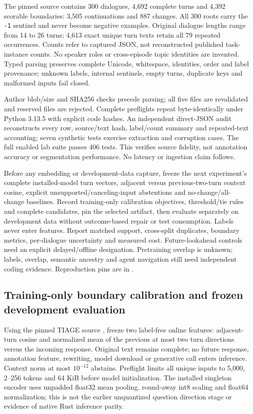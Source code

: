 \documentclass[11pt]{article}
\begin{document}
The pinned source contains 300 dialogues, 4,692 complete turns and 4,392 scorable
boundaries: 3,505 continuations and 887 changes. All 300 roots carry the
\texttt{-1} sentinel and never become negative examples. Original dialogue
lengths range from 14 to 26 turns; 4,613 exact unique turn texts retain all 79
repeated occurrences. Counts refer to captured JSON, not reconstructed published
task-instance counts. No speaker roles or cross-episode topic identities are
invented. Typed parsing preserves complete Unicode, whitespace, identities,
order and label provenance; unknown labels, internal sentinels, empty turns,
duplicate keys and malformed inputs fail closed.

Author blob/size and SHA256 checks precede parsing; all five files are
revalidated and reserved files are rejected. Complete preflights repeat
byte-identically under Python 3.13.5 with explicit code hashes. An independent direct-JSON audit reconstructs every row,
source/text hash, label/count summary and repeated-text accounting; seven
synthetic tests exercise extraction and corruption cases. The full enabled
lab suite passes 406 tests. This verifies source fidelity, not annotation
accuracy or segmentation performance. No latency or ingestion claim follows.

Before any embedding or development-data capture, freeze the next experiment's
complete installed-model turn vectors, adjacent versus previous-two-turn context
cosine, explicit unsupported/canceling-input abstentions and no-change/all-change
baselines. Record training-only calibration objectives, threshold/tie rules and
complete candidates, pin the selected artifact, then evaluate separately on
development data without outcome-based repair or test consumption. Labels never
enter features. Report matched support, cross-split duplicates, boundary metrics,
per-dialogue uncertainty and measured cost. Future-lookahead controls need an
explicit delayed/offline designation. Pretraining overlap is unknown; labels,
overlap, semantic ancestry and agent navigation still need independent coding
evidence. Reproduction pins are in
.

\subsection{Training-only boundary calibration and frozen development evaluation}
Using the pinned TIAGE source \cite{xie2021tiage}, freeze two label-free online
features: adjacent-turn cosine and normalized mean of the previous at most two
turn directions versus the incoming response. Original text remains complete;
no future response, annotation feature, rewriting, model download or generative
call enters inference. Context norm at most $10^{-12}$ abstains. Preflight limits
all unique inputs to 5,000, 2--256 tokens and 64 KiB before model initialization.
The installed singleton encoder uses unpadded float32 mean pooling, round-away
int8 scaling and float64 normalization; this is not the earlier unquantized
question direction stage or evidence of native Rust inference parity.
\end{document}
